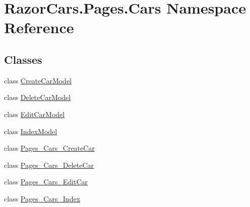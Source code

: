 \hypertarget{namespace_razor_cars_1_1_pages_1_1_cars}{}\section{Razor\+Cars.\+Pages.\+Cars Namespace Reference}
\label{namespace_razor_cars_1_1_pages_1_1_cars}
\subsection*{Classes}
\begin{DoxyCompactItemize}
\item 
class \mbox{\hyperlink{class_razor_cars_1_1_pages_1_1_cars_1_1_create_car_model}{Create\+Car\+Model}}
\item 
class \mbox{\hyperlink{class_razor_cars_1_1_pages_1_1_cars_1_1_delete_car_model}{Delete\+Car\+Model}}
\item 
class \mbox{\hyperlink{class_razor_cars_1_1_pages_1_1_cars_1_1_edit_car_model}{Edit\+Car\+Model}}
\item 
class \mbox{\hyperlink{class_razor_cars_1_1_pages_1_1_cars_1_1_index_model}{Index\+Model}}
\item 
class \mbox{\hyperlink{class_razor_cars_1_1_pages_1_1_cars_1_1_pages___cars___create_car}{Pages\+\_\+\+Cars\+\_\+\+Create\+Car}}
\item 
class \mbox{\hyperlink{class_razor_cars_1_1_pages_1_1_cars_1_1_pages___cars___delete_car}{Pages\+\_\+\+Cars\+\_\+\+Delete\+Car}}
\item 
class \mbox{\hyperlink{class_razor_cars_1_1_pages_1_1_cars_1_1_pages___cars___edit_car}{Pages\+\_\+\+Cars\+\_\+\+Edit\+Car}}
\item 
class \mbox{\hyperlink{class_razor_cars_1_1_pages_1_1_cars_1_1_pages___cars___index}{Pages\+\_\+\+Cars\+\_\+\+Index}}
\end{DoxyCompactItemize}
